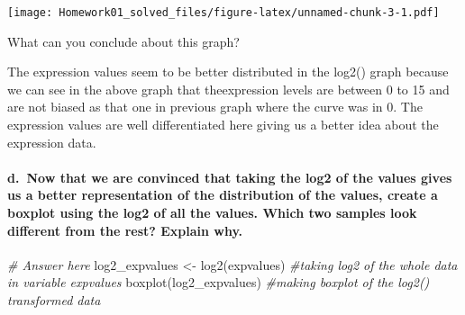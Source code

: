\documentclass[
]{article}
\newenvironment{Shaded}{\begin{snugshade}}{\end{snugshade}}
\newcommand{\AttributeTok}[1]{\textcolor[rgb]{0.77,0.63,0.00}{#1}}
\newcommand{\CommentTok}[1]{\textcolor[rgb]{0.56,0.35,0.01}{\textit{#1}}}
\newcommand{\DecValTok}[1]{\textcolor[rgb]{0.00,0.00,0.81}{#1}}
\newcommand{\FunctionTok}[1]{\textcolor[rgb]{0.00,0.00,0.00}{#1}}
\newcommand{\NormalTok}[1]{#1}
\newcommand{\OtherTok}[1]{\textcolor[rgb]{0.56,0.35,0.01}{#1}}
\newcommand{\SpecialCharTok}[1]{\textcolor[rgb]{0.00,0.00,0.00}{#1}}
\begin{document}
\begin{Shaded}
\end{Shaded}

\texttt{[image: Homework01\_solved\_files/figure-latex/unnamed-chunk-3-1.pdf]}

What can you conclude about this graph?

The expression values seem to be better distributed in the log2() graph
because we can see in the above graph that theexpression levels are
between 0 to 15 and are not biased as that one in previous graph where
the curve was in 0. The expression values are well differentiated here
giving us a better idea about the expression data.

\hypertarget{d.-now-that-we-are-convinced-that-taking-the-log2-of-the-values-gives-us-a-better-representation-of-the-distribution-of-the-values-create-a-boxplot-using-the-log2-of-all-the-values.-which-two-samples-look-different-from-the-rest-explain-why.}{%
\paragraph{d.~Now that we are convinced that taking the log2 of the
values gives us a better representation of the distribution of the
values, create a boxplot using the log2 of all the values. Which two
samples look different from the rest? Explain
why.}\label{d.-now-that-we-are-convinced-that-taking-the-log2-of-the-values-gives-us-a-better-representation-of-the-distribution-of-the-values-create-a-boxplot-using-the-log2-of-all-the-values.-which-two-samples-look-different-from-the-rest-explain-why.}}

\begin{Shaded}
\begin{Highlighting}[]
\CommentTok{\# Answer here}
\NormalTok{log2\_expvalues }\OtherTok{\textless{}{-}} \FunctionTok{log2}\NormalTok{(expvalues) }\CommentTok{\#taking log2 of the whole data in variable expvalues}
\FunctionTok{boxplot}\NormalTok{(log2\_expvalues) }\CommentTok{\#making boxplot of the log2() transformed data}
\end{Highlighting}
\end{Shaded}
\end{document}
